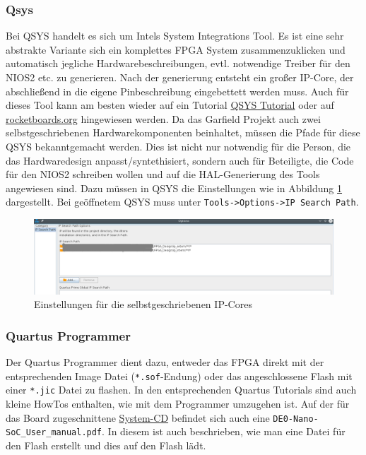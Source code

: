 \subsubsection{Qsys}
Bei QSYS handelt es sich um Intels System Integrations Tool. Es ist eine sehr abstrakte Variante sich ein komplettes \ac{FPGA} System zusammenzuklicken und automatisch jegliche Hardwarebeschreibungen, evtl. notwendige Treiber für den NIOS2 etc. zu generieren. Nach der generierung entsteht ein großer IP-Core, der abschließend in die eigene Pinbeschreibung eingebettett werden muss. Auch für dieses Tool kann am besten wieder auf ein Tutorial \href{https://www.altera.com/content/dam/altera-www/global/en_US/pdfs/literature/tt/tt_qsys_intro.pdf}{QSYS Tutorial} oder auf \href{rocketboards.org}{rocketboards.org} hingewiesen werden.
Da das Garfield Projekt auch zwei selbstgeschriebenen Hardwarekomponenten beinhaltet, müssen die Pfade für diese QSYS bekanntgemacht werden. Dies ist nicht nur notwendig für die Person, die das Hardwaredesign anpasst/syntethisiert, sondern auch für Beteiligte, die Code für den NIOS2 schreiben wollen und auf die \ac{HAL}-Generierung des Tools angewiesen sind. Dazu müssen in QSYS die Einstellungen wie in Abbildung \ref{Settings:IP} dargestellt. Bei geöffnetem QSYS muss unter \texttt{Tools->Options->IP Search Path}.

\begin{figure}
	\includegraphics[width=\textwidth]{Abb/Qsys_settings.png}
	\caption{Einstellungen für die selbstgeschriebenen \ac{IP}-Cores}
	\label{Settings:IP}
\end{figure}

\subsubsection{Quartus Programmer}
Der Quartus Programmer dient dazu, entweder das \ac{FPGA} direkt mit der entsprechenden Image Datei (\texttt{*.sof}-Endung) oder das angeschlossene Flash mit einer \texttt{*.jic} Datei zu flashen. In den entsprechenden Quartus Tutorials sind auch kleine HowTos enthalten, wie mit dem Programmer umzugehen ist. Auf der für das Board zugeschnittene \href{http://www.terasic.com/downloads/cd-rom/de0-nano-soc/}{System-CD} befindet sich auch eine \texttt{DE0-Nano-SoC\_User\_manual.pdf}. In diesem ist auch beschrieben, wie man eine Datei für den Flash erstellt und dies auf den Flash lädt.